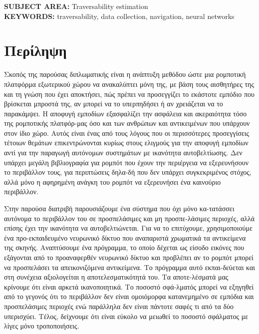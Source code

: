 \documentclass[12pt,a4paper,table,dvipsnames,tikz]{report}
\begin{document}
	\vfill
	\noindent
	\MakeUppercase{\textbf{Subject Area: }} Traversability estimation
	\\
	\MakeUppercase{\textbf{Keywords: }} traversability, data collection, navigation, 
	neural networks 
	
	
	\chapter*{Περίληψη}
	\thispagestyle{empty}
	
	Σκοπός της παρούσας διπλωματικής είναι η ανάπτυξη μεθόδου ώστε μια ρομποτική 
	πλατφόρμα εξωτερικού χώρου να ανακαλύπτει μόνη της, με βάση τους αισθητήρες της 
	και τη γνώση που έχει αποκτήσει, πώς πρέπει να προσεγγίζει το εκάστοτε εμπόδιο 
	που βρίσκεται μπροστά της, αν μπορεί να το υπερπηδήσει ή αν χρειάζεται να το 
	παρακάμψει. Η αποφυγή εμποδίων εξασφαλίζει την ασφάλεια και ακεραιότητα τόσο της 
	ρομποτικής πλατφόρ-μας όσο και των ανθρώπων και αντικειμένων που υπάρχουν στον 
	ίδιο χώρο. Αυτός είναι ένας από τους λόγους που οι περισσότερες προσεγγίσεις 
	τέτοιων θεμάτων επικεντρώνονται κυρίως στους ελιγμούς για την αποφυγή εμποδίων 
	αντί για την παραγωγή αυτόνομων συστημάτων με ικανότητα αυτοβελτίωσης.
	Δεν υπάρχει μεγάλη βιβλιογραφία για ρομπότ που έχουν την περιέργεια να εξερευνήσουν 
	το περιβάλλον τους, για περιπτώσεις δηλα-δή που δεν υπάρχει συγκεκριμένος στόχος, 
	αλλά μόνο η αφηρημένη ανάγκη του ρομπότ να εξερευνήσει ένα καινούριο περιβάλλον.
	\par
	Στην παρούσα διατριβή παρουσιάζουμε ένα σύστημα που όχι μόνο κα-τατάσσει αυτόνομα 
	το περιβάλλον του σε προσπελάσιμες και μη προσπε-λάσιμες περιοχές, αλλά επίσης έχει 
	την ικανότητα να αυτοβελτιώνεται.
	Για να το επιτύχουμε, χρησιμοποιούμε ένα προ-εκπαιδευμένο νευρωνικό δίκτυο που 
	αναπαριστά χρωματικά τα αντικείμενα της σκηνής. Αναπτύσουμε ένα πρόγραμμα, το οποίο 
	δέχεται ως είσοδο εικόνες που εξάγονται από το προαναφερθέν νευρωνικό δίκτυο και 
	προβλέπει αν το ρομπότ μπορεί να προσπελάσει τα απεικονιζόμενα αντικείμενα. 
	Το πρόγραμμα αυτό εκπαι-δεύεται και στη συνέχεια αξιολογείται η αποτελεσματικότητά του. 
	Τα αποτε-λέσματά μας κρίνουμε ότι είναι αρκετά ικανοποιητικά. Το ποσοστό σφά-λματός 
	μπορεί να εξηγηθεί από το γεγονός ότι το περιβάλλον δεν είναι ομοιόμορφα κατανεμημένο 
	σε εμπόδια και προσπελάσιμες περιοχές ενώ παράλληλα δεν είναι πάντοτε σαφές τι από 
	τα δύο υπερισχύει. Τέλος, δείχνουμε ότι είναι εύκολο να μειωθεί το ποσοστό σφάλματος  
	με λίγες μόνο τροποποιήσεις.
	
\end{document}
